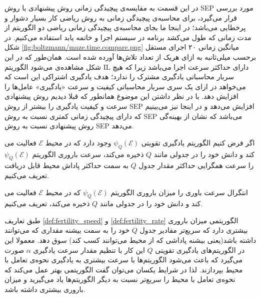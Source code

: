  در این قسمت به مقایسه‌‌ی پیچیدگی زمانی روش پیشنهادی با روش SEP مورد بررسی قرار می‌گیرد، برای محاسبه‌ی پیچیدگی زمانی به روش ریاضی کار بسیار دشوار و پرخطایی می‌باشد؛ در اینجا ما بجای محاسبه‌ی پیچیدگی زمانی ریاضی دو الگوریتم از مدت زمانی که طول می‌کشد برنامه در سیستم اجرا و خاتمه یابد استفاده می‌کنیم. در شکل
\ref{fig:boltzmann/maze.time.compare.png}
میانگین زمانی ۲۰ اجرای مستقل برحسب میلی‌ثانبه به ازای هریک از تعداد تلاش‌ها آورده شده است. همان‌طور که در این شکل مشاهده‌ی می‌شود الگوریتم IL دارای حداکثر سرعت اجرا می‌باشد زیرا که هیچ سربار محاسباتی یادگیری مشترک را ندارد؛ هدف یادگیری اشتراکی این است که می‌خواهد در ازای یک سری سربار محاسباتی کیفیت و سرعت «یادگیری» عامل‌ها را افزایش دهد. با در نظر داشتن این موضوع همانطور که قبلا دیدیم روش پیشنهادی سرعت و کیفیت یادگیری را بیشتر از روش SEP افزایش می‌دهد و در اینجا نیز می‌بینیم که دارای پیچیدگی زمانی کمتری نسبت به روش SEP می‌باشد که نشان از بهینه‌گی روش پیشنهادی نسبت به روش SEP می‌دهد.


\begin{definition}\setstretch{\thebaselinestretch}\label{def:fertility_speed}
اگر فرض کنیم الگوریتم یادگیری تقویتی $\psi_Q(\mathcal{E})$ وجود دارد که در محیط $\mathcal{E}$ فعالیت می کند و دانش خود را در جدولی مانند $Q$ ذخیره می‌کند، سرعت باروری الگوریتم $\psi_Q(\mathcal{E})$ را سرعت همگرایی حداکثر مقدار جدول $Q$ به سمت حداکثر پاداش محیط قابل دریافت تعریف می‌کنیم.
\end{definition}
\begin{definition}\setstretch{\thebaselinestretch}\label{def:fertility_rate}
انتگرال سرعت باوری را میزان باروری الگوریتم $\psi_Q(\mathcal{E})$ که در محیط $\mathcal{E}$ فعالیت می کند و دانش خود را در جدولی مانند $Q$ ذخیره می‌کند، تعریف می‌کنیم.
\end{definition}

\begin{theorem}\setstretch{\thebaselinestretch}\label{theorem:learning_speed}
طبق تعاریف \ref{def:fertility_speed} و \ref{def:fertility_rate} الگوریتمی میزان باروری بیشتری دارد که سریع‌تر مقادیر جدول $Q$ خود را به سمت بیشنه مقداری که می‌توانند داشته باشد(یعنی بیشنه پاداشی که از محیط می‌توانند کسب کند) سوق دهد. معمولا این در الگوریتم‌های یادگیری تقویتی $Q$ این کار با تنظیم مقدار سرعت یادگیری $\alpha$ صورت می‌گیرد که باعث می‌شود الگوریتم‌ها با سرعت بیشتری به یادگیری نحوه‌ی تعامل با محیط بپردازند. لذا در شرایط یکسان می‌توان گفت الگوریتمی بهتر عمل می‌کند که نحوه‌ی تعامل با محیط را سریع‌تر نسبت به دیگر الگوریتم‌ها یاد می‌گیرید و میزان باروری بیشتری داشته باشد.
\end{theorem}


